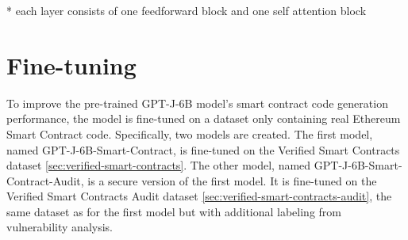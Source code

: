 * each layer consists of one feedforward block and one self attention block


\section{Fine-tuning}
\label{sec:fine-tuning}
To improve the pre-trained GPT-J-6B model's smart contract code generation performance, the model is fine-tuned on a dataset only containing real Ethereum Smart Contract code. Specifically, two models are created. The first model, named GPT-J-6B-Smart-Contract, is fine-tuned on the Verified Smart Contracts dataset \cref{sec:verified-smart-contracts}. The other model, named GPT-J-6B-Smart-Contract-Audit, is a secure version of the first model. It is fine-tuned on the Verified Smart Contracts Audit dataset \cref{sec:verified-smart-contracts-audit}, the same dataset as for the first model but with additional labeling from vulnerability analysis.

